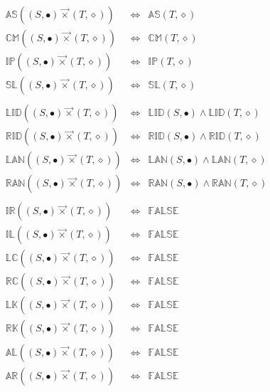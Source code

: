 \documentclass[10pt]{report}
\newcommand{\propname}[1]{{\mathbb{#1}}}
\begin{document}
\[
\begin{array}{rcl} 
\propname{AS}((S, \bullet) \vec{\times} (T, \diamond)) 
   & \Leftrightarrow %
   & \propname{AS}(T, \diamond) \\ 
\propname{CM}((S, \bullet) \vec{\times} (T, \diamond)) 
   & \Leftrightarrow %
   & \propname{CM}(T, \diamond) \\ 
\propname{IP}((S, \bullet) \vec{\times} (T, \diamond)) 
   & \Leftrightarrow %
   & \propname{IP}(T, \diamond) \\ 
\propname{SL}((S, \bullet) \vec{\times}  (T, \diamond)) 
   & \Leftrightarrow %
   & \propname{SL}(T, \diamond) \\ \\
   
\propname{LID}((S, \bullet) \vec{\times} (T, \diamond)) 
   & \Leftrightarrow %
   & \propname{LID}(S, \bullet) \wedge  \propname{LID}(T, \diamond) \\ 
\propname{RID}((S, \bullet) \vec{\times} (T, \diamond)) 
   & \Leftrightarrow %
   & \propname{RID}(S, \bullet) \wedge  \propname{RID}(T, \diamond) \\  
\propname{LAN}((S, \bullet) \vec{\times} (T, \diamond)) 
   & \Leftrightarrow %
   & \propname{LAN}(S, \bullet) \wedge  \propname{LAN}(T, \diamond) \\
\propname{RAN}((S, \bullet) \vec{\times} (T, \diamond)) 
   & \Leftrightarrow %
   & \propname{RAN}(S, \bullet) \wedge  \propname{RAN}(T, \diamond) \\ \\
   
\propname{IR}((S, \bullet) \vec{\times}  (T, \diamond)) 
   & \Leftrightarrow %
   & \propname{FALSE} \\
\propname{IL}((S, \bullet) \vec{\times}  (T, \diamond)) 
   & \Leftrightarrow %
   & \propname{FALSE} \\
\propname{LC}((S, \bullet) \vec{\times} (T, \diamond)) 
   & \Leftrightarrow %
   & \propname{FALSE} \\
\propname{RC}((S, \bullet) \vec{\times} (T, \diamond)) 
   & \Leftrightarrow %
   & \propname{FALSE} \\
\propname{LK}((S, \bullet) \vec{\times} (T, \diamond)) 
   & \Leftrightarrow %
   & \propname{FALSE} \\
\propname{RK}((S, \bullet) \vec{\times} (T, \diamond)) 
   & \Leftrightarrow %
   & \propname{FALSE} \\
\propname{AL}((S, \bullet) \vec{\times}  (T, \diamond))  
   & \Leftrightarrow %
   & \propname{FALSE} \\
\propname{AR}((S, \bullet) \vec{\times}  (T, \diamond))  
   & \Leftrightarrow %
   & \propname{FALSE} \\
\end{array}
\] 
\end{document}
